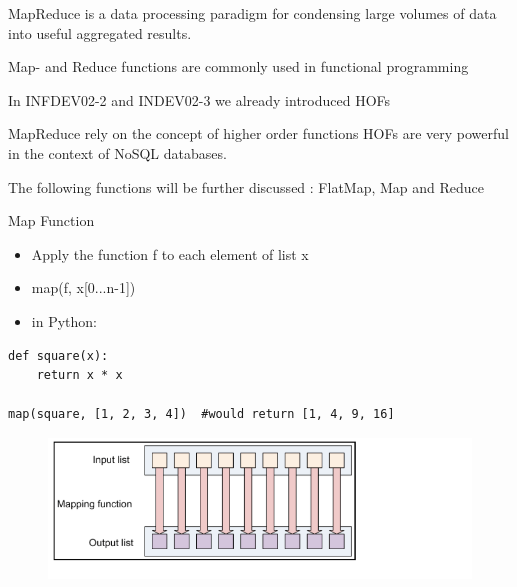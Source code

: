 \documentclass{beamer}
\begin{document}
\begin{slide}{
\item MapReduce is a data processing paradigm for condensing large volumes of data into useful aggregated results.
\item Map- and Reduce functions are commonly used in functional programming   
\item In INFDEV02-2 and INDEV02-3 we already introduced HOFs
\item MapReduce rely on the concept of higher order functions HOFs are very powerful in the context of NoSQL databases. 
\item The following functions will be further discussed : FlatMap, Map and Reduce 
}\end{slide}


\begin{frame}[fragile]{Map Function}
\begin{itemize}
\item Apply the function f to each element of list x
\item map(f, x[0...n-1])
\item in Python: \\
\end{itemize}
\begin{lstlisting}
def square(x):  
	return x * x 

map(square, [1, 2, 3, 4])  #would return [1, 4, 9, 16]
 \end{lstlisting}
\begin{figure}
		\includegraphics[scale=0.23]{img/map}
\end{figure}
\end{frame}
\end{document}
